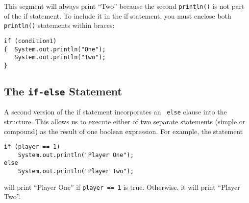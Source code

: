\noindent This segment will always print ``Two'' because the
second {\tt println()} is not part of the if statement. To include it
in the if statement, you must enclose both {\tt println()}
statements within braces:

\begin{jjjlisting}
\begin{lstlisting}
if (condition1)
{  System.out.println("One");
   System.out.println("Two");
}
\end{lstlisting}
\end{jjjlisting}



\subsection{The {\tt if-else} Statement}
\label{sec-ifelse}

\noindent A second version of the if statement incorporates an {\tt
else} clause into the structure.  This allows us to execute either of
two separate statements (simple or compound) as the result of one
boolean expression.  For example, the statement

\begin{jjjlisting}
\begin{lstlisting}
if (player == 1)
    System.out.println("Player One");
else
    System.out.println("Player Two");
\end{lstlisting}
\end{jjjlisting}

\noindent will print ``Player One'' if {\tt player == 1} is true.
Otherwise, it will print ``Player Two''.


